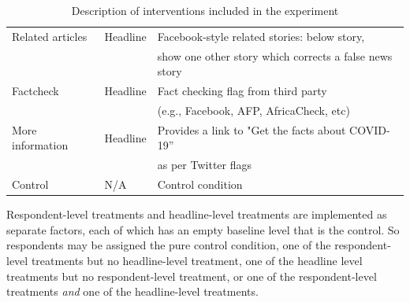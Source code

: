 \documentclass[letterpaper, 12pt, parskip=full,]{scrartcl}
\begin{document}
\begin{table}[H]
\begin{tabular}{l|l|l}
Related articles                                                                                                       & Headline                                                                                                     & Facebook-style related stories: below story,\\ & & show one other story which corrects a false news story                                                                                                                                                                                                                                                                                             \\
Factcheck                                                                                                      & Headline                                                                                                     & Fact checking flag from third party\\ & & (e.g., Facebook, AFP, AfricaCheck, etc)
 \\
More information                                                                                                      & Headline                                                                                                     & Provides a link to "Get the facts about COVID-19''\\ & & as per Twitter flags
 \\
Control                                                                                                        & N/A                                                                                                          & Control condition                                                                                                                                                                                                                                                                                                                                                                                              
\end{tabular}
\caption{Description of interventions included in the experiment}
\label{tab:treatments}
\end{table}

Respondent-level treatments and headline-level treatments are implemented as separate factors, each of which has an empty baseline level that is the control. So respondents may be assigned the pure control condition, one of the respondent-level treatments but no headline-level treatment, one of the headline level treatments but no respondent-level treatment, or one of the respondent-level treatments \textit{and} one of the headline-level treatments. 
\end{document}
